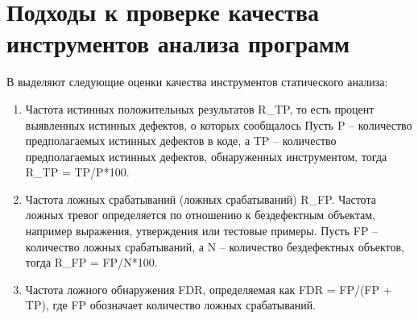 \section{Подходы к проверке качества инструментов анализа программ}
В \cite{BencmarkingJorg} выделяют следующие оценки качества инструментов статического анализа: 
\begin{enumerate}
    \item Частота истинных положительных результатов R\_TP, то есть процент выявленных истинных дефектов, о которых сообщалось Пусть P -- количество предполагаемых истинных дефектов в коде, а TP -- количество предполагаемых истинных дефектов, обнаруженных инструментом, тогда R\_TP = TP/P*100.
    \item Частота ложных срабатываний (ложных срабатываний) R\_FP. Частота ложных тревог определяется по отношению к бездефектным объектам, например выражения, утверждения или тестовые примеры. Пусть FP -- количество ложных срабатываний, а N -- количество бездефектных объектов, тогда R\_FP = FP/N*100.
    \item Частота ложного обнаружения FDR, определяемая как FDR = FP/(FP + TP), где FP обозначает количество ложных срабатываний.
\end{enumerate}

\FloatBarrier
